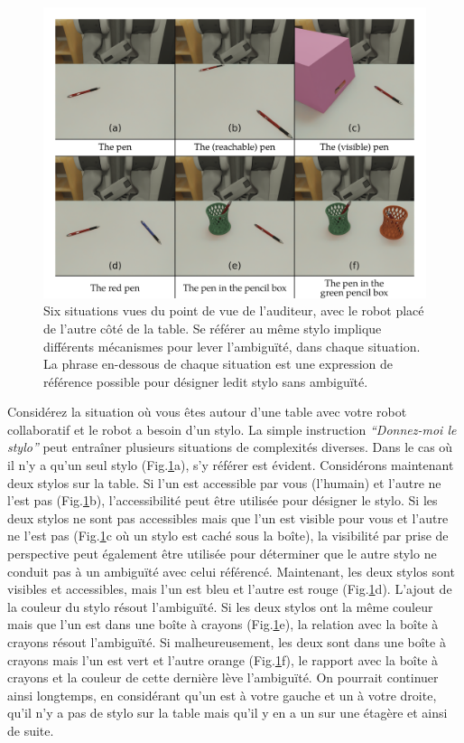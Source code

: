 \begin{figure}[ht!]
\centering
\includegraphics[scale=0.16]{figures/chapter4/intro.png}
\caption{\label{fig:annex_chap4_intro} Six situations vues du point de vue de l'auditeur, avec le robot placé de l'autre côté de la table. Se référer au même stylo implique différents mécanismes pour lever l'ambiguïté, dans chaque situation. La phrase en-dessous de chaque situation est une expression de référence possible pour désigner ledit stylo sans ambiguïté.}
\end{figure}

Considérez la situation où vous êtes autour d'une table avec votre robot collaboratif et le robot a besoin d'un stylo. La simple instruction \textit{``Donnez-moi le stylo''} peut entraîner plusieurs situations de complexités diverses. Dans le cas où il n'y a qu'un seul stylo (Fig.\ref{fig:annex_chap4_intro}a), s'y référer est évident. Considérons maintenant deux stylos sur la table. Si l'un est accessible par vous (l'humain) et l'autre ne l'est pas (Fig.\ref{fig:annex_chap4_intro}b), l'accessibilité peut être utilisée pour désigner le stylo. Si les deux stylos ne sont pas accessibles mais que l'un est visible pour vous et l'autre ne l'est pas (Fig.\ref{fig:annex_chap4_intro}c où un stylo est caché sous la boîte), la visibilité par prise de perspective peut également être utilisée pour déterminer que le autre stylo ne conduit pas à un ambiguïté avec celui référencé. Maintenant, les deux stylos sont visibles et accessibles, mais l'un est bleu et l'autre est rouge (Fig.\ref{fig:annex_chap4_intro}d). L'ajout de la couleur du stylo résout l'ambiguïté. Si les deux stylos ont la même couleur mais que l'un est dans une boîte à crayons (Fig.\ref{fig:annex_chap4_intro}e), la relation avec la boîte à crayons résout l'ambiguïté. Si malheureusement, les deux sont dans une boîte à crayons mais l'un est vert et l'autre orange (Fig.\ref{fig:annex_chap4_intro}f), le rapport avec la boîte à crayons et la couleur de cette dernière lève l'ambiguïté. On pourrait continuer ainsi longtemps, en considérant qu'un est à votre gauche et un à votre droite, qu'il n'y a pas de stylo sur la table mais qu'il y en a un sur une étagère et ainsi de suite.

